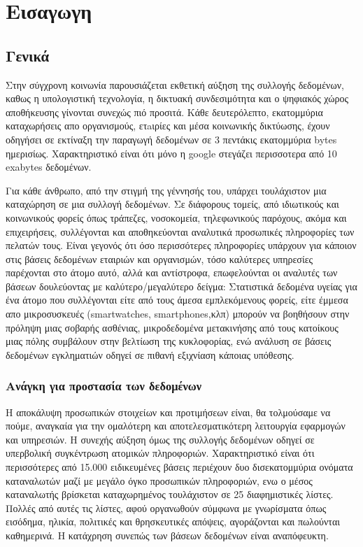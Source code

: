 \chapter{Εισαγωγη}

\section{Γενικά}

Στην σύγχρονη κοινωνία παρουσιάζεται εκθετική αύξηση της συλλογής δεδομένων, καθως η υπολογιστική τεχνολογία, η δικτυακή συνδεσιμότητα και ο ψηφιακός χώρος αποθήκευσης γίνονται συνεχώς πιό προσιτά. Κάθε δευτερόλεπτο, εκατομμύρια καταχωρήσεις απο οργανισμούς, ετaιρίες και μέσα κοινωνικής δικτύωσης, έχουν οδηγήσει σε εκτίναξη
την παραγωγή δεδομένων σε 3 πεντάκις εκατομμύρια \textlatin{bytes} ημερισίως. Χαρακτηριστικό είναι ότι μόνο η \textlatin{google} στεγάζει περισσοτερα από 10 \textlatin{exabytes} δεδομένων.

Για κάθε άνθρωπο, από την στιγμή της γέννησής του, υπάρχει τουλάχιστον μια καταχώρηση σε μια συλλογή δεδομένων. Σε διάφορους τομείς, από ιδιωτικούς και κοινωνικούς φορείς όπως τράπεζες, νοσοκομεία, τηλεφωνικούς παρόχους, ακόμα και επιχειρήσεις, συλλέγονται και αποθηκεύονται αναλυτικά προσωπικές πληροφορίες των πελατών τους. Είναι γεγονός ότι όσο περισσότερες πληροφορίες υπάρχουν για κάποιον στις βάσεις δεδομένων εταιριών και οργανισμών, τόσο καλύτερες υπηρεσίες παρέχονται στο άτομο αυτό, αλλά και αντίστροφα, επωφελούνται οι αναλυτές των βάσεων δουλεύοντας με καλύτερο/μεγαλύτερο δείγμα: Στατιστικά δεδομένα υγείας για ένα άτομο που συλλέγονται είτε από τους άμεσα εμπλεκόμενους φορείς, είτε έμμεσα απο μικροσυσκευές (\textlatin{smartwatches, smartphones},κλπ) μπορούν να βοηθήσουν στην πρόληψη μιας σοβαρής ασθένιας, μικροδεδομένα μετακινήσης από τους κατοίκους μιας πόλης συμβάλουν στην βελτίωση της κυκλοφορίας, ενώ ανάλυση σε βάσεις δεδομένων εγκληματιών οδηγεί σε πιθανή εξιχνίαση κάποιας υπόθεσης. 

\subsection{Ανάγκη για προστασία των δεδομένων}

Η αποκάλυψη προσωπικών στοιχείων και προτιμήσεων είναι, θα τολμούσαμε να πούμε, αναγκαία για την ομαλότερη και αποτελεσματικότερη λειτουργία εφαρμογών και υπηρεσιών. Η συνεχής αύξηση όμως της συλλογής δεδομένων οδηγεί σε υπερβολική συγκέντρωση ατομικών πληροφοριών. Χαρακτηριστικό είναι ότι περισσότερες από 15.000 ειδικευμένες βάσεις περιέχουν δυο δισεκατομμύρια ονόματα καταναλωτών μαζί με μεγάλο όγκο προσωπικών πληροφοριών, ενω ο μέσος καταναλωτής βρίσκεται καταχωρημένος τουλάχιστον σε 25 διαφημιστικές λίστες. Πολλές από αυτές τις λίστες, αφού οργανωθούν σύμφωνα με γνωρίσματα όπως εισόδημα, ηλικία, πολιτικές και θρησκευτικές απόψεις, αγοράζονται και πωλούνται καθημερινά. Η κατάχρηση συνεπώς των βάσεων δεδομένων είναι αναπόφευκτη.

